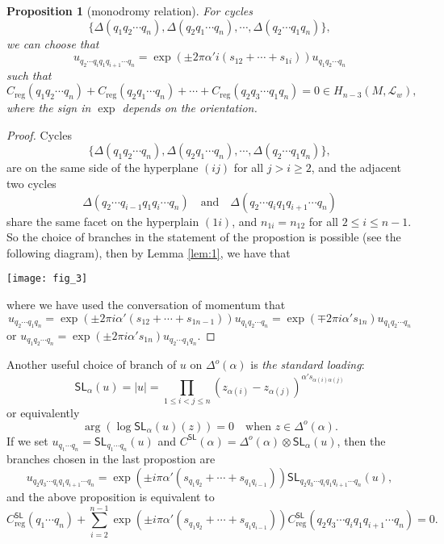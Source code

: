 \documentclass[11pt]{article}
\theoremstyle{definition}
\theoremstyle{plain}
\newtheorem{pro}[para]{Proposition}
\begin{document}
\begin{pro}[monodromy relation]
For cycles
\[
	\{\Delta(q_1q_2\cdots q_n),\Delta(q_2q_1\cdots q_n),\cdots,
	\Delta(q_2\cdots q_1q_n)\},
\]
we can choose that
\[
	u_{q_2\cdots q_iq_1q_{i+1}\cdots q_n}=\exp(\pm 2\pi \alpha' i (s_{12}+\cdots+s_{1i}))u_{q_1q_2\cdots q_n}
\]
such that
\[
	C_{\mathrm{reg}}(q_1q_2\cdots q_n)+C_{\mathrm{reg}}(q_2q_1\cdots q_n)
	+\cdots+C_{\mathrm{reg}}(q_2q_3\cdots q_1 q_n)=0 \in H_{n-3}(M,\mathcal L_w),
\]
where the sign in $\exp$ depends on the orientation.
\end{pro}

\begin{proof}[Proof]
Cycles
\[
	\{\Delta(q_1q_2\cdots q_n),\Delta(q_2q_1\cdots q_n),\cdots,
	\Delta(q_2\cdots q_1q_n)\},
\]
are on the same side of the hyperplane $(ij)$ for all 
$j>i\geq 2$, and the adjacent two cycles
\[
	\Delta(q_2\cdots q_{i-1}q_1 q_i\cdots q_n)
\quad \text{and}\quad 
	\Delta(q_2\cdots q_{i}q_1 q_{i+1}\cdots q_n)
\]
share the same facet on the hyperplain $(1i)$, and 
$n_{1i}=n_{12}$ for all $2\leq i\leq n-1$.
So the choice of branches in the statement of the propostion is 
possible (see the following diagram), then by Lemma \ref{lem:1}, we
have that
\begin{center}
\texttt{[image: fig\_3]}
\end{center}
where we have used the conversation of momentum that
\[
	u_{q_2\cdots q_1q_n}=\exp(\pm 2\pi i\alpha' (s_{12}+\cdots+s_{1{n-1}}))u_{q_1q_2\cdots q_n}=\exp(\mp2\pi i\alpha' s_{1n})u_{q_1q_2\cdots q_n}
\]
or $u_{q_1q_2\cdots q_n}=\exp(\pm 2\pi i\alpha' s_{1n})u_{q_2\cdots q_1q_n}$.
\end{proof}

Another useful choice of branch of $u$ on $\Delta^o(\alpha)$ is
\textit{the standard loading}:
\[
	\mathsf{SL}_\alpha(u)=|u|=\prod_{1\leq i<j \leq n} (z_{\alpha(i)}-z_{\alpha(j)})^{\alpha' s_{\alpha(i)\alpha(j)}}
\]
or equivalently
\[
	\arg(\log \mathsf{SL}_\alpha(u)(z))=0 \quad \text{when $z\in \Delta^o(\alpha)$}.
\]
If we set $u_{q_1\cdots q_n}=\mathsf{SL}_{q_1\cdots q_n}(u)$ and
$C^{\mathsf{SL}}(\alpha)=\Delta^o(\alpha)\otimes \mathsf{SL}_\alpha(u)$, then the branches chosen in the last propostion are
\[
	u_{q_2q_3\cdots q_i q_1 q_{i+1}\cdots q_n}=\exp(\pm i\pi\alpha' (s_{q_1q_2}+\cdots+s_{q_1q_{i-1}}))
	\mathsf{SL}_{q_2q_3\cdots q_i q_1 q_{i+1}\cdots q_n}(u),
\]
and the above proposition is equivalent to 
\[
	C_{\text{reg}}^{\mathsf{SL}}(q_1\cdots q_n)+\sum_{i=2}^{n-1}\exp(\pm i\pi\alpha' (s_{q_1q_2}+\cdots+s_{q_1q_{i-1}}))
	C_{\text{reg}}^{\mathsf{SL}}(q_2q_3\cdots q_i q_1 q_{i+1}\cdots q_n)=0.
\]
\end{document}
